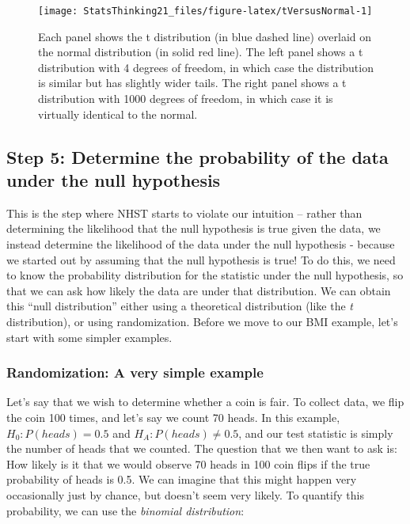 \documentclass[12pt,]{book}
\theoremstyle{definition}
\theoremstyle{definition}
\theoremstyle{definition}
\theoremstyle{remark}
\begin{document}
\begin{figure}
\texttt{[image: StatsThinking21\_files/figure-latex/tVersusNormal-1]} \caption{Each panel shows the t distribution (in blue dashed line) overlaid on the normal distribution (in solid red line).  The left panel shows a t distribution with 4 degrees of freedom, in which case the distribution is similar but has slightly wider tails.  The right panel shows a t distribution with 1000 degrees of freedom, in which case it is virtually identical to the normal.}\label{fig:tVersusNormal}
\end{figure}

\hypertarget{step-5-determine-the-probability-of-the-data-under-the-null-hypothesis}{%
\subsection{Step 5: Determine the probability of the data under the null hypothesis}\label{step-5-determine-the-probability-of-the-data-under-the-null-hypothesis}}

This is the step where NHST starts to violate our intuition -- rather than determining the likelihood that the null hypothesis is true given the data, we instead determine the likelihood of the data under the null hypothesis - because we started out by assuming that the null hypothesis is true! To do this, we need to know the probability distribution for the statistic under the null hypothesis, so that we can ask how likely the data are under that distribution. We can obtain this ``null distribution'' either using a theoretical distribution (like the \emph{t} distribution), or using randomization. Before we move to our BMI example, let's start with some simpler examples.

\hypertarget{randomization-very-simple}{%
\subsubsection{Randomization: A very simple example}\label{randomization-very-simple}}

Let's say that we wish to determine whether a coin is fair. To collect data, we flip the coin 100 times, and let's say we count 70 heads. In this example, \(H_0: P(heads)=0.5\) and \(H_A: P(heads) \neq 0.5\), and our test statistic is simply the number of heads that we counted. The question that we then want to ask is: How likely is it that we would observe 70 heads in 100 coin flips if the true probability of heads is 0.5. We can imagine that this might happen very occasionally just by chance, but doesn't seem very likely. To quantify this probability, we can use the \emph{binomial distribution}:
\end{document}
